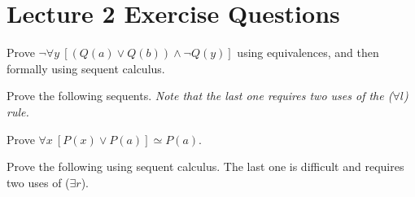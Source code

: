 \documentclass{supervision}
\begin{document}
  \section*{Lecture 2 Exercise Questions}
  \begin{questions}
    \question Prove $\lnot \forall y \: [(Q(a) \lor Q(b)) \land \lnot Q(y)]$
      using equivalences, and then formally using sequent calculus.

    \question Prove the following sequents. \emph{Note that the last one
      requires two uses of the ($\forall l$) rule.}

    \question Prove $\forall x \: [P(x) \lor P(a)] \simeq P(a)$.

    \question Prove the following using sequent calculus. The last one is
      difficult and requires two uses of ($\exists r$).


\end{questions}
\end{document}
